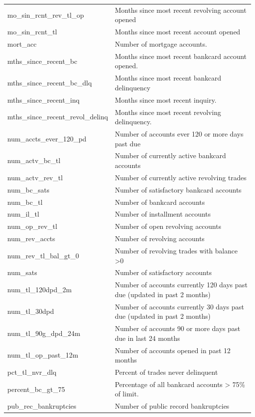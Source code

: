 \documentclass[11pt,]{report}
\begin{document}
\begin{longtable}[t]{>{\raggedright\arraybackslash}p{7cm}>{\raggedright\arraybackslash}p{7cm}}
\addlinespace
mo\_sin\_rcnt\_rev\_tl\_op & Months since most recent revolving account opened\\
mo\_sin\_rcnt\_tl & Months since most recent account opened\\
mort\_acc & Number of mortgage accounts.\\
mths\_since\_recent\_bc & Months since most recent bankcard account opened.\\
mths\_since\_recent\_bc\_dlq & Months since most recent bankcard delinquency\\
\addlinespace
mths\_since\_recent\_inq & Months since most recent inquiry.\\
mths\_since\_recent\_revol\_delinq & Months since most recent revolving delinquency.\\
num\_accts\_ever\_120\_pd & Number of accounts ever 120 or more days past due\\
num\_actv\_bc\_tl & Number of currently active bankcard accounts\\
num\_actv\_rev\_tl & Number of currently active revolving trades\\
\addlinespace
num\_bc\_sats & Number of satisfactory bankcard accounts\\
num\_bc\_tl & Number of bankcard accounts\\
num\_il\_tl & Number of installment accounts\\
num\_op\_rev\_tl & Number of open revolving accounts\\
num\_rev\_accts & Number of revolving accounts\\
\addlinespace
num\_rev\_tl\_bal\_gt\_0 & Number of revolving trades with balance >0\\
num\_sats & Number of satisfactory accounts\\
num\_tl\_120dpd\_2m & Number of accounts currently 120 days past due (updated in past 2 months)\\
num\_tl\_30dpd & Number of accounts currently 30 days past due (updated in past 2 months)\\
num\_tl\_90g\_dpd\_24m & Number of accounts 90 or more days past due in last 24 months\\
\addlinespace
num\_tl\_op\_past\_12m & Number of accounts opened in past 12 months\\
pct\_tl\_nvr\_dlq & Percent of trades never delinquent\\
percent\_bc\_gt\_75 & Percentage of all bankcard accounts > 75\% of limit.\\
pub\_rec\_bankruptcies & Number of public record bankruptcies\\

\end{longtable}
\end{document}
